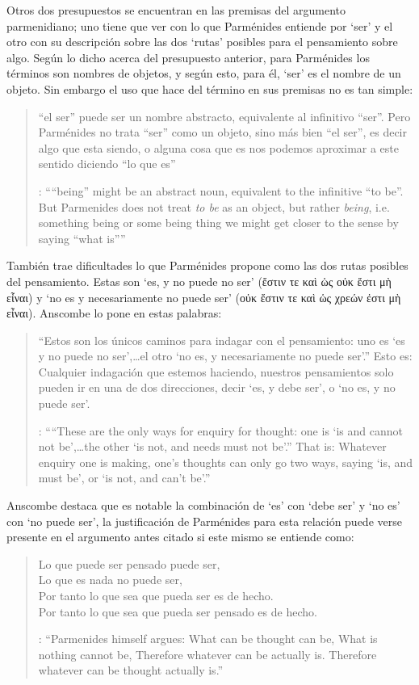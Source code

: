 Otros dos presupuestos se encuentran en las premisas del argumento parmenidiano; uno tiene que ver con lo que Parménides entiende por `ser' y el otro con su descripción sobre las dos `rutas' posibles para el pensamiento sobre algo. Según lo dicho acerca del presupuesto anterior, para Parménides los términos son nombres de objetos, y según esto, para él, `ser' es el nombre de un objeto. Sin embargo el uso que hace del término en sus premisas no es tan simple: \blockquote[{\cite[x]{anscombe1981parmenides}}: \enquote{``being'' might be an abstract noun, equivalent to the infinitive ``to be''. But Parmenides does not treat \emph{to be} as an object, but rather \emph{being}, i.e. something being or some being thing \textelp{} we might get closer to the sense by saying ``what is''}]{``el ser'' puede ser un nombre abstracto, equivalente al infinitivo ``ser''. Pero Parménides no trata ``ser'' como un objeto, sino más bien ``el ser'', es decir algo que esta siendo, o alguna cosa que es \textelp{} nos podemos aproximar a este sentido diciendo ``lo que es''}. También trae dificultades lo que Parménides propone como las dos rutas posibles del pensamiento. Estas son \enquote*{es, y no puede no ser} (\textgreek{ἔστιν τε καὶ ὡς οὐκ ἔστι μὴ εἶναι}) y \enquote*{no es y necesariamente no puede ser} (\textgreek{οὐκ ἔστιν τε καὶ ὡς χρεών ἐστι μὴ εἶναι}). Anscombe lo pone en estas palabras: \blockquote[{\cite[x]{anscombe1981parmenides}}: \enquote{``These are the only ways for enquiry for thought: one is `is and cannot not be',\ldots the other `is not, and needs must not be'.'' That is: Whatever enquiry one is making, one's thoughts can only go two ways, saying `is, and must be', or `is not, and can't be'.}]{``Estos son los únicos caminos para indagar con el pensamiento: uno es `es y no puede no ser',\ldots el otro `no es, y necesariamente no puede ser'.'' Esto es: Cualquier indagación que estemos haciendo, nuestros pensamientos solo pueden ir en una de dos direcciones, decir `es, y debe ser', o `no es, y no puede ser'.} Anscombe destaca que es notable la combinación de `es' con `debe ser'  y `no es' con `no puede ser', la justificación de Parménides para esta relación puede verse presente en el argumento antes citado si este mismo se entiende como: \blockquote[{\cite[vii]{anscombe1981parmenides}}: \enquote{Parmenides himself argues: What can be thought can be, What is nothing cannot be, Therefore whatever can be actually is. Therefore whatever can be thought actually is.}]{Lo que puede ser pensado puede ser,\\
Lo que es nada no puede ser,\\
Por tanto lo que sea que pueda ser es de hecho.\\
Por tanto lo que sea que pueda ser pensado es de hecho.}

